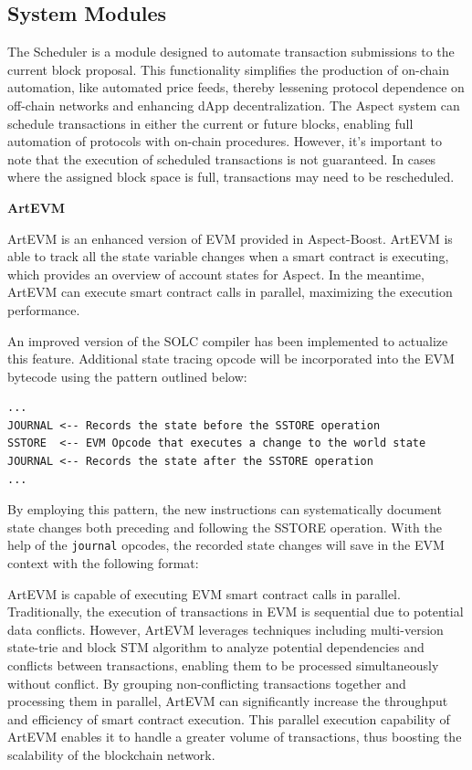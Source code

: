 \subsection{System Modules}

The Scheduler is a module designed to automate transaction submissions to the current block proposal. This functionality simplifies the production of on-chain automation, like automated price feeds, thereby lessening protocol dependence on off-chain networks and enhancing dApp decentralization. The Aspect system can schedule transactions in either the current or future blocks, enabling full automation of protocols with on-chain procedures. However, it's important to note that the execution of scheduled transactions is not guaranteed. In cases where the assigned block space is full, transactions may need to be rescheduled.

\textbf{ArtEVM}

ArtEVM is an enhanced version of EVM provided in Aspect-Boost. ArtEVM is able to track all the state variable changes when a smart contract is executing, which provides an overview of account states for Aspect. In the meantime, ArtEVM can execute smart contract calls in parallel, maximizing the execution performance.

An improved version of the SOLC compiler has been implemented to actualize this feature. Additional state tracing opcode will be incorporated into the EVM bytecode using the pattern outlined below:

\begin{verbatim}
...
JOURNAL <-- Records the state before the SSTORE operation
SSTORE  <-- EVM Opcode that executes a change to the world state
JOURNAL <-- Records the state after the SSTORE operation
...
\end{verbatim}

By employing this pattern, the new instructions can systematically document state changes both preceding and following the SSTORE operation. With the help of the \texttt{journal} opcodes, the recorded state changes will save in the EVM context with the following format:

ArtEVM is capable of executing EVM smart contract calls in parallel. Traditionally, the execution of transactions in EVM is sequential due to potential data conflicts. However, ArtEVM leverages techniques including multi-version state-trie and block STM algorithm to analyze potential dependencies and conflicts between transactions, enabling them to be processed simultaneously without conflict. By grouping non-conflicting transactions together and processing them in parallel, ArtEVM can significantly increase the throughput and efficiency of smart contract execution. This parallel execution capability of ArtEVM enables it to handle a greater volume of transactions, thus boosting the scalability of the blockchain network.

